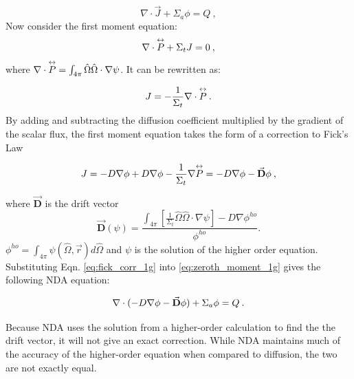 \begin{equation}
  \nabla \cdot \vec{J} + \Sigma_a\phi  =  Q\:,
  \label{eq:zeroth_moment_1g}
\end{equation}
Now consider the first moment equation:
  \begin{equation}
  \nabla \cdot \overset{\text{\scriptsize$\leftrightarrow$}}{P} + \Sigma_t J = 0\:,
  \end{equation}
where $\nabla \cdot \overset{\text{\scriptsize$\leftrightarrow$}}{P} =  \int_{4\pi} \hat{\Omega} \hat{\Omega} \cdot \nabla \psi$. It can be rewritten as: 

  \begin{equation}
  J= -\frac{1}{\Sigma_t} \nabla \cdot \overset{\text{\scriptsize$\leftrightarrow$}}{P}\:. 
  \end{equation}
  By adding and subtracting the diffusion coefficient multiplied by the gradient of the scalar flux, the first moment equation takes the form of a correction to Fick's Law
  
  \begin{equation}
  J = -D \nabla \phi + D \nabla \phi - \frac{1}{\Sigma_t} \nabla \overset{\text{\scriptsize$\leftrightarrow$}}{P} = -D \nabla \phi - \vec{\textbf{D}} \phi \:,
  \label{eq:fick_corr_1g}
  \end{equation}
  
where $\vec{\textbf{D}}$ is the drift vector
 \begin{equation}
  \vec{\textbf{D}} (\psi) = \frac{\int_{4\pi} [\frac{1}{\Sigma_t} \hat{\Omega} \hat{\Omega}\cdot \nabla \psi] - D \nabla \phi^{ho}}{\phi^{ho}}.
  \label{eq:drift_vector}
  \end{equation} 
$\phi^{ho} = \int_{4\pi} \psi(\hat{\Omega}, \vec{r}) d\hat{\Omega}$ and $\psi$ is the solution of the higher order equation. Substituting Eqn. \eqref{eq:fick_corr_1g} into \eqref{eq:zeroth_moment_1g} gives the following NDA equation:

  \begin{equation}
  \nabla\cdot(-D \nabla \phi - \vec{\bf D} \phi) + \Sigma_a \phi = Q \:. \label{eq:NDA_1g}
  \end{equation}
  
Because NDA uses the solution from a higher-order calculation to find the the drift vector, it will not give an exact correction. While NDA maintains much of the accuracy of the higher-order equation when compared to diffusion, the two are not exactly equal. 




